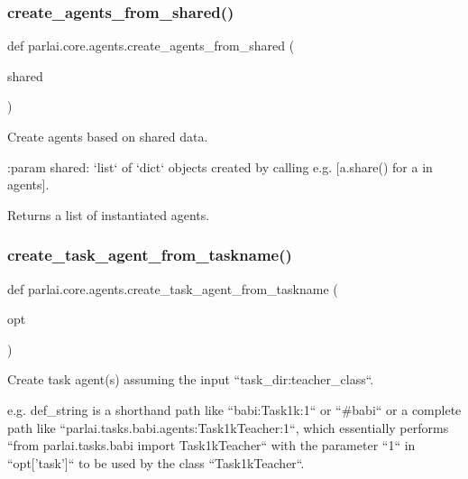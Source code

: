 \subsubsection{\texorpdfstring{create\+\_\+agents\+\_\+from\+\_\+shared()}{create\_agents\_from\_shared()}}
{\footnotesize\ttfamily def parlai.\+core.\+agents.\+create\+\_\+agents\+\_\+from\+\_\+shared (\begin{DoxyParamCaption}\item[{}]{shared }\end{DoxyParamCaption})}

\begin{DoxyVerb}Create agents based on shared data.

:param shared: `list` of `dict` objects created by calling e.g.
    [a.share() for a in agents].

Returns a list of instantiated agents.
\end{DoxyVerb}
 \mbox{\label{namespaceparlai_1_1core_1_1agents_ab4473fa54af02b5ab385b41b51dacd10}} 
\subsubsection{\texorpdfstring{create\+\_\+task\+\_\+agent\+\_\+from\+\_\+taskname()}{create\_task\_agent\_from\_taskname()}}
{\footnotesize\ttfamily def parlai.\+core.\+agents.\+create\+\_\+task\+\_\+agent\+\_\+from\+\_\+taskname (\begin{DoxyParamCaption}\item[{}]{opt }\end{DoxyParamCaption})}

\begin{DoxyVerb}Create task agent(s) assuming the input ``task_dir:teacher_class``.

e.g. def_string is a shorthand path like ``babi:Task1k:1`` or ``#babi`` or a
complete path like ``parlai.tasks.babi.agents:Task1kTeacher:1``, which essentially
performs ``from parlai.tasks.babi import Task1kTeacher`` with the parameter ``1`` in
``opt['task']`` to be used by the class ``Task1kTeacher``.
\end{DoxyVerb}
 \mbox{\label{namespaceparlai_1_1core_1_1agents_a14a9d134d76ffd0509e50703d0f2c949}} 
